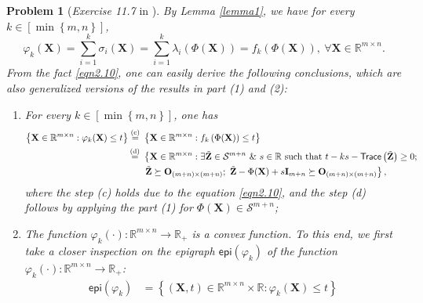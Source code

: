 \documentclass[11pt]{article}
\newtheorem{problem}{Problem}
\numberwithin{equation}{problem}
\begin{document}
\begin{problem} [\emph{Exercise 11.7} in \cite{calafiore2014optimization}]
{\indent By Lemma \ref{lemma1}, we have for every $k \in \left[ \min \left\{ m, n \right\} \right]$,
\begin{equation}
    \label{eqn2.10}
    \varphi_k (\mathbf{X}) = \sum_{i=1}^{k} \sigma_i (\mathbf{X})
    = \sum_{i=1}^{k} \lambda_i \left( \Phi (\mathbf{X}) \right) 
    = f_k \left( \Phi(\mathbf{X}) \right),\ \forall \mathbf{X} \in \mathbb{R}^{m \times n}.
\end{equation}
From the fact \eqref{eqn2.10}, one can easily derive the following conclusions, which are also generalized versions of the results in part (1) and (2):
\begin{enumerate} [label=(\roman*)]
    \item For every $k \in \left[ \min \left\{ m, n \right\} \right]$, one has
    \begin{equation*}
        \begin{split}
            \left\{ \mathbf{X} \in \mathbb{R}^{m \times n} : \varphi_k (\mathbf{X}) \leq t \right\}
            \stackrel{\textnormal{(c)}}{=} \ & \left\{ \mathbf{X} \in \mathbb{R}^{m \times n} : f_k \left( \Phi (\mathbf{X}) \right) \leq t \right\} \\
            \stackrel{\textnormal{(d)}}{=} \ & \left\{ \mathbf{X} \in \mathbb{R}^{m \times n} : \exists \tilde{\mathbf{Z}} \in \mathcal{S}^{m+n} \ \& \ s \in \mathbb{R} \textnormal{ such that } t - ks - \textsf{Trace} \left( \tilde{\mathbf{Z}} \right) \geq 0; \right. \\
            &\left. \tilde{\mathbf{Z}} \succeq \mathbf{O}_{(m+n) \times (m+n)}; \ \tilde{\mathbf{Z}} - \Phi (\mathbf{X}) + s \mathbf{I}_{m+n}
            \succeq \mathbf{O}_{(m+n) \times (m+n)} \right\},
        \end{split}
    \end{equation*}
    where the step (c) holds due to the equation \eqref{eqn2.10}, and the step (d) follows by applying the part (1) for $\Phi (\mathbf{X}) \in \mathcal{S}^{m+n}$;
    \item The function $\varphi_k (\cdot): \mathbb{R}^{m \times n} \rightarrow \mathbb{R}_{+}$ is a convex function. To this end, we first take a closer inspection on the epigraph $\textsf{epi} \left( \varphi_k \right)$ of the function $\varphi_k (\cdot): \mathbb{R}^{m \times n} \rightarrow \mathbb{R}_{+}$:
    \begin{equation}
        \label{eqn2.11}
        \begin{split}
            \textsf{epi} \left( \varphi_k \right)
            &= \left\{ \left( \mathbf{X}, t \right) \in \mathbb{R}^{m \times n} \times \mathbb{R}: \varphi_k (\mathbf{X}) \leq t \right\} \\

\end{split}
\end{equation}
\end{enumerate}}
\end{problem}
\end{document}
